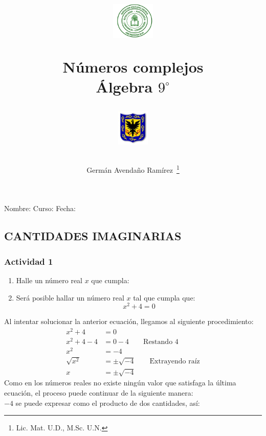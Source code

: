 \documentclass[letterpaper,11pt,twoside]{article}
\author{Germ\'an Avenda\~no Ram\'irez~\thanks{Lic. Mat. U.D., M.Sc. U.N.}}
\title{\begin{minipage}{.2\textwidth}
\includegraphics[height=1.75cm]{Images/logo-colegio.png}\end{minipage}
\begin{minipage}{.55\textwidth}
\begin{center}
Números complejos\\
Álgebra $9^{\circ}$
\end{center}
\end{minipage}\hfill
\begin{minipage}{.2\textwidth}
\includegraphics[height=1.75cm]{Images/logo-sed.png} 
\end{minipage}}
\date{}
\begin{document}
\maketitle
Nombre: \hrulefill Curso: \underline{\hspace*{44pt}} Fecha: \underline{\hspace*{2.5cm}}
\begin{multicols}{2}
\section*{CANTIDADES IMAGINARIAS}
\subsubsection*{Actividad 1}
\begin{enumerate}
  \item Halle un número real $ x $ que cumpla:
  \begin{enumerate}   
  \end{enumerate}
  \item Será posible hallar un número real $ x $ tal que cumpla que:
  \[ x^2+4=0 \]
\end{enumerate}
Al intentar solucionar la anterior ecuación, llegamos al siguiente procedimiento:
\begin{align*}
  x^2+4&=0 \\
  x^2+4-4&=0-4 \qquad \text{Restando 4}\\
  x^2&=-4\\
  \sqrt{x^2}&=\pm \sqrt{-4} \qquad\text{Extrayendo raíz}\\
  x&=\pm \sqrt{-4}
\end{align*}
Como en los números reales no existe ningún valor que satisfaga la última ecuación, el proceso puede continuar de la siguiente manera:\\

$ -4 $ se puede expresar como el producto de dos cantidades, así:\\


\end{multicols}
\end{document}
